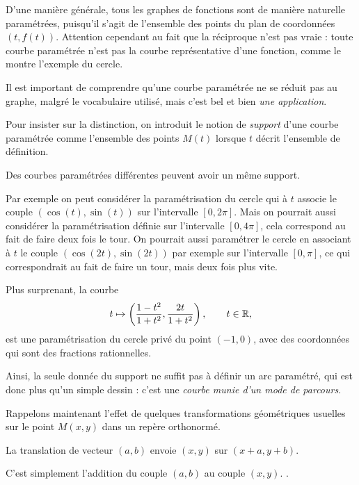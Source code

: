 \change
D'une manière générale, tous les graphes de fonctions sont de 
manière naturelle paramétrées, puisqu'il s'agit 
de l'ensemble des points du plan de coordonnées $(t,f(t))$. 
Attention cependant au fait que la réciproque n'est pas vraie : 
toute courbe paramétrée n'est pas la courbe représentative 
d'une fonction, comme le montre l'exemple du cercle.

\diapo

Il est important de comprendre qu'une courbe paramétrée 
ne se réduit pas au graphe, malgré le vocabulaire utilisé, 
mais c'est bel et bien \emph{une application}.

Pour insister sur la distinction, on introduit le notion 
de \emph{support} d'une courbe paramétrée comme l'ensemble 
des points $M(t)$ lorsque $t$ décrit l'ensemble de définition.

\change

Des courbes paramétrées différentes peuvent avoir un même support.

Par exemple on peut considérer la paramétrisation du cercle qui 
à $t$ associe le couple $(\cos(t),\sin(t))$ sur 
l'intervalle $[0,2\pi]$.
Mais on pourrait aussi considérer la paramétrisation définie 
sur l'intervalle $[0,4\pi]$, cela correspond au fait 
de faire deux fois le tour. 
On pourrait aussi paramétrer le cercle en associant à $t$ 
le couple $(\cos(2t),\sin(2t))$ par exemple sur 
l'intervalle $[0,\pi]$, ce qui correspondrait au fait de faire un tour, 
mais deux fois plus vite.

\change

Plus surprenant, la courbe 
$$t\mapsto \left(\frac{1-t^2}{1+t^2},\frac{2t}{1+t^2}\right), \qquad t\in\mathbb{R},$$
est une paramétrisation du cercle privé du point $(-1,0)$, 
avec des coordonnées qui sont des fractions rationnelles.

Ainsi, la seule donnée du support ne suffit pas à définir un arc 
paramétré, qui est donc plus qu'un simple dessin :
c'est une \emph{courbe munie d'un mode de parcours}.


\diapo

Rappelons maintenant l'effet de quelques transformations 
géométriques usuelles sur le point $M(x,y)$ dans un repère orthonormé.


La translation de vecteur $(a,b)$ envoie $(x,y)$  sur $(x+a,y+b)$.


\change
C'est simplement l'addition 
du couple $(a,b)$ au couple $(x,y)$. .

